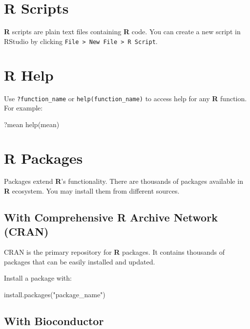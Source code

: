 \documentclass[
  letterpaper,
  DIV=11,
  numbers=noendperiod]{scrreprt}
\newenvironment{Shaded}{\begin{snugshade}}{\end{snugshade}}
\newcommand{\FunctionTok}[1]{\textcolor[rgb]{0.28,0.35,0.67}{#1}}
\newcommand{\NormalTok}[1]{\textcolor[rgb]{0.00,0.23,0.31}{#1}}
\newcommand{\StringTok}[1]{\textcolor[rgb]{0.13,0.47,0.30}{#1}}
\begin{document}
\section{R Scripts}\label{r-scripts}

\textbf{R} scripts are plain text files containing \textbf{R} code. You
can create a new script in RStudio by clicking
\texttt{File\ \textgreater{}\ New\ File\ \textgreater{}\ R\ Script}.

\section{R Help}\label{r-help}

Use \texttt{?function\_name} or \texttt{help(function\_name)} to access
help for any \textbf{R} function. For example:

\begin{Shaded}
\begin{Highlighting}[]
\NormalTok{?mean}
\FunctionTok{help}\NormalTok{(mean)}
\end{Highlighting}
\end{Shaded}

\section{R Packages}\label{r-packages}

Packages extend \textbf{R}'s functionality. There are thousands of
packages available in \textbf{R} ecosystem. You may install them from
different sources.

\subsection{With Comprehensive R Archive Network
(CRAN)}\label{with-comprehensive-r-archive-network-cran}

CRAN is the primary repository for \textbf{R} packages. It contains
thousands of packages that can be easily installed and updated.

Install a package with:

\begin{Shaded}
\begin{Highlighting}[]
\FunctionTok{install.packages}\NormalTok{(}\StringTok{"package\_name"}\NormalTok{)}
\end{Highlighting}
\end{Shaded}

\subsection{With Bioconductor}\label{with-bioconductor}
\end{document}
